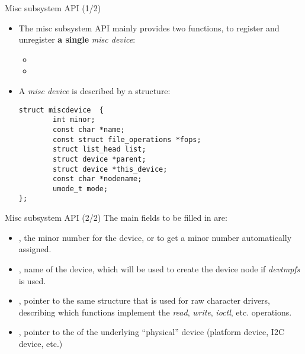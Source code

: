 \begin{frame}[fragile]{Misc subsystem API (1/2)}
  \begin{itemize}
  \item The misc subsystem API mainly provides two functions, to
    register and unregister {\bf a single} {\em misc device}:
    \begin{itemize}
    \item {}
    \item {}
    \end{itemize}
  \item A {\em misc device} is described by a 
    structure:
    \begin{verbatim}
struct miscdevice  {
        int minor;
        const char *name;
        const struct file_operations *fops;
        struct list_head list;
        struct device *parent;
        struct device *this_device;
        const char *nodename;
        umode_t mode;
};
\end{verbatim}
  \end{itemize}
\end{frame}

\begin{frame}[fragile]{Misc subsystem API (2/2)}
  The main fields to be filled in  are:
  \begin{itemize}
  \item {}, the minor number for the device, or
     to get a minor number automatically
    assigned.
  \item {}, name of the device, which will be used to create
    the device node if {\em devtmpfs} is used.
  \item {}, pointer to the same  structure
    that is used for raw character drivers, describing which functions
    implement the {\em read}, {\em write}, {\em ioctl}, etc. operations.
  \item {}, pointer to the  of the
    underlying ``physical'' device (platform device, I2C device, etc.)
  \end{itemize}
\end{frame}

